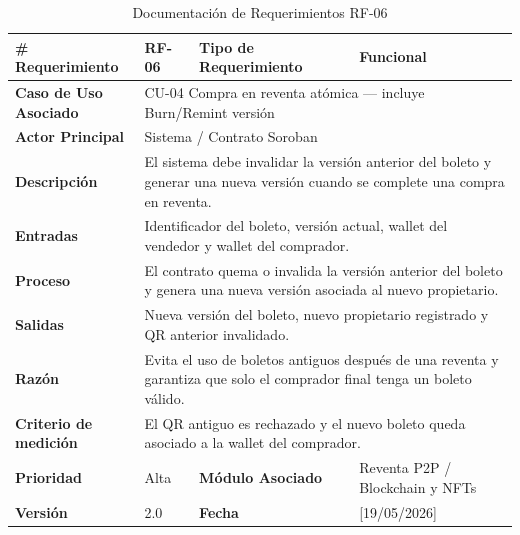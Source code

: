 \documentclass[12pt,letterpaper]{article}
\begin{document}
\begin{table}[H]
\centering
\scriptsize
\renewcommand{\arraystretch}{1.05}
\setlength{\tabcolsep}{3pt}

\newlength{\anchoceldaRFseis}
\setlength{\anchoceldaRFseis}{\dimexpr\textwidth-2.7cm-8\tabcolsep-5\arrayrulewidth\relax}

\begin{tabularx}{\textwidth}{|p{2.7cm}|X|p{2.8cm}|X|}
\hline
\textbf{\# Requerimiento} & RF-06 & \textbf{Tipo de Requerimiento} & Funcional \\ \hline

\textbf{Caso de Uso Asociado} & 
\multicolumn{3}{p{\anchoceldaRFseis}|}{CU-04 Compra en reventa atómica --- incluye Burn/Remint versión} \\ \hline

\textbf{Actor Principal} & 
\multicolumn{3}{p{\anchoceldaRFseis}|}{Sistema / Contrato Soroban} \\ \hline

\textbf{Descripción} & 
\multicolumn{3}{p{\anchoceldaRFseis}|}{El sistema debe invalidar la versión anterior del boleto y generar una nueva versión cuando se complete una compra en reventa.} \\ \hline

\textbf{Entradas} & 
\multicolumn{3}{p{\anchoceldaRFseis}|}{Identificador del boleto, versión actual, wallet del vendedor y wallet del comprador.} \\ \hline

\textbf{Proceso} & 
\multicolumn{3}{p{\anchoceldaRFseis}|}{El contrato quema o invalida la versión anterior del boleto y genera una nueva versión asociada al nuevo propietario.} \\ \hline

\textbf{Salidas} & 
\multicolumn{3}{p{\anchoceldaRFseis}|}{Nueva versión del boleto, nuevo propietario registrado y QR anterior invalidado.} \\ \hline

\textbf{Razón} & 
\multicolumn{3}{p{\anchoceldaRFseis}|}{Evita el uso de boletos antiguos después de una reventa y garantiza que solo el comprador final tenga un boleto válido.} \\ \hline

\textbf{Criterio de medición} & 
\multicolumn{3}{p{\anchoceldaRFseis}|}{El QR antiguo es rechazado y el nuevo boleto queda asociado a la wallet del comprador.} \\ \hline

\textbf{Prioridad} & Alta & \textbf{Módulo Asociado} & Reventa P2P / Blockchain y NFTs \\ \hline

\textbf{Versión} & 2.0 & \textbf{Fecha} & [19/05/2026] \\ \hline

\end{tabularx}

\caption{Documentación de Requerimientos RF-06}
\label{tab:documentacion_requerimientos_rf06}
\normalsize
\end{table}
\end{document}
